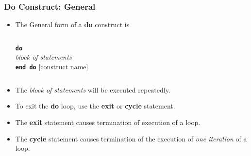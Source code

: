 \documentclass[slidestop,mathserif,compress,xcolor=svgnames]{beamer}
\newenvironment{bblock}[0]
{
\begin{beamerboxesrounded}[upper=uppercol1,lower=lowercol1,shadow=true]}
{\end{beamerboxesrounded}}
\begin{document}
\begin{frame}
  \frametitle{\small Do Construct: General}
  \begin{itemize}
    \item The General form of a \textbf{do} construct is
    \begin{columns}
      \column{5cm}
      \scriptsize{
        \begin{block}{}
          \begin{tabbing}
            [con\=struct name:] \textbf{\texttt{do}} \\
            \> \textit{block of statements} \\
            \textbf{\texttt{end do}} [construct name]
          \end{tabbing}
        \end{block}
      }
    \end{columns}
    \item The \textit{block of statements} will be executed repeatedly.
    \item To exit the \textbf{do} loop, use the \textbf{exit} or \textbf{cycle} statement.
    \item The \textbf{exit} statement causes termination of execution of a loop.
    \item The \textbf{cycle } statement causes termination of the execution of \textit{one iteration} of a loop.
  \end{itemize}
\end{frame}
\end{document}

